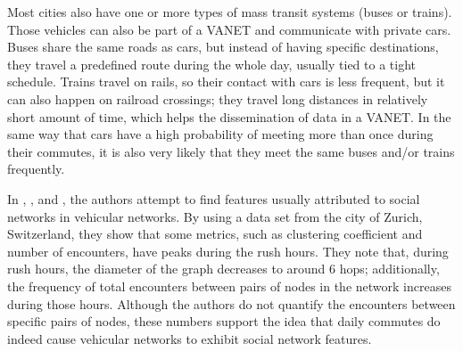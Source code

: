 
Most cities also have one or more types of mass transit systems (buses or trains).
Those vehicles can also be part of a VANET and communicate with private cars.
Buses share the same roads as cars, but instead of having specific destinations, they travel a predefined route during the whole day, usually tied to a tight schedule.
Trains travel on rails, so their contact with cars is less frequent, but it can also happen on railroad crossings; they travel long distances in relatively short amount of time, which helps the dissemination of data in a VANET.
In the same way that cars have a high probability of meeting more than once during their commutes, it is also very likely that they meet the same buses and/or trains frequently.

In \citep{da2013effective}, \citep{cunha2014vehicular}, and \citep{cunha2014possible}, the authors attempt to find features usually attributed to social networks in vehicular networks.
By using a data set from the city of Zurich, Switzerland, they show that some metrics, such as clustering coefficient and number of encounters, have peaks during the rush hours.
They note that, during rush hours, the diameter of the graph decreases to around 6 hops; additionally, the frequency of total encounters between pairs of nodes in the network increases during those hours.
Although the authors do not quantify the encounters between specific pairs of nodes, these numbers support the idea that daily commutes do indeed cause vehicular networks to exhibit social network features.




